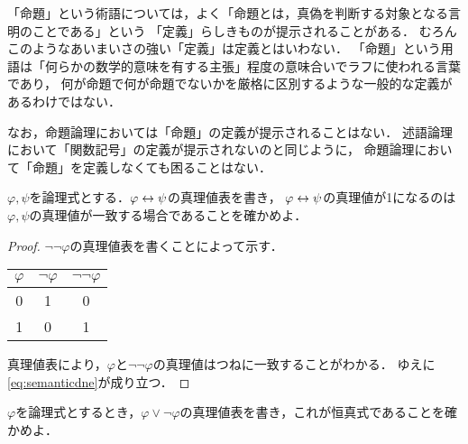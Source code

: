 \begin{Note}
	「命題」という術語については，よく「命題とは，真偽を判断する対象となる言明のことである」という
	「定義」らしきものが提示されることがある．
	むろんこのようなあいまいさの強い「定義」は定義とはいわない．
	「命題」という用語は「何らかの数学的意味を有する主張」程度の意味合いでラフに使われる言葉であり，
	何が命題で何が命題でないかを厳格に区別するような一般的な定義があるわけではない．

	なお，命題論理においては「命題」の定義が提示されることはない．
	述語論理において「関数記号」の定義が提示されないのと同じように，
	命題論理において「命題」を定義しなくても困ることはない．
\end{Note}

\begin{Que} \label{Que:truthtableforequivalent}
	\(\varphi, \psi\)を論理式とする．\(\varphi \leftrightarrow \psi\)の真理値表を書き，
	\(\varphi \leftrightarrow \psi\)の真理値が1になるのは\(\varphi, \psi\)の真理値が一致する場合であることを確かめよ．
\end{Que}


\begin{proof}
	\(\lnot \lnot \varphi\)の真理値表を書くことによって示す．
	\begin{table}[htbp]
		\centering
		\begin{tabular}{c|cc}
			\hline
			\(\varphi\) & \(\lnot \varphi\) & \(\lnot \lnot \varphi\) \\ \hline
			0           & 1                 & 0                       \\
			1           & 0                 & 1                       \\
			\hline
		\end{tabular}
	\end{table}

	真理値表により，\(\varphi\)と\(\lnot \lnot \varphi\)の真理値はつねに一致することがわかる．
	ゆえに\cref{eq:semanticdne}が成り立つ．
\end{proof}

\begin{Que} \label{Que:semanticlawofexcludedmiddle}
	\(\varphi\)を論理式とするとき，\(\varphi \lor \lnot \varphi\)の真理値表を書き，これが恒真式であることを確かめよ．
\end{Que}

